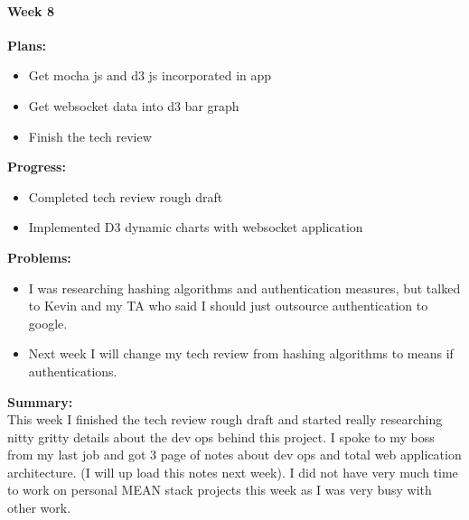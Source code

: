 \paragraph{Week 8}
\begin{adjustwidth}{2.5em}{0pt}
    \vspace{-0.5cm}\textbf{Plans:}
    \vspace{-0.5cm}
    \begin{itemize}
        \item Get mocha js and d3 js incorporated in app
        \item Get websocket data into d3 bar graph
        \item Finish the tech review 
    \end{itemize} 
    \vspace{-0.3cm}\textbf{Progress:}
    \vspace{-0.5cm}
    \begin{itemize}
        \item Completed tech review rough draft
        \item Implemented D3 dynamic charts with websocket application
    \end{itemize} 
    \vspace{-0.3cm}\textbf{Problems:}
    \vspace{-0.5cm}
    \begin{itemize}
        \item I was researching hashing algorithms and authentication measures, but talked to Kevin and my TA who said I should just outsource authentication to google.
        \item Next week I will change my tech review from hashing algorithms to means if authentications.
    \end{itemize}  
    \vspace{-0.3cm}\noindent\textbf{Summary:}\\
    \noindent This week I finished the tech review rough draft and started really researching nitty gritty details about the dev ops behind this project. I spoke to my boss from my last job and got 3 page of notes about dev ops and total web application architecture. (I will up load this notes next week). I did not have very much time to work on personal MEAN stack projects this week as I was very busy with other work.
\end{adjustwidth} 
